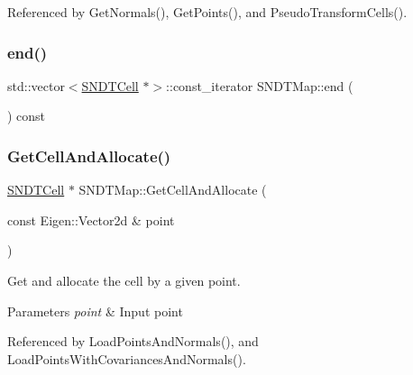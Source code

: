 Referenced by Get\+Normals(), Get\+Points(), and Pseudo\+Transform\+Cells().

\mbox{\label{classSNDTMap_a521ae4876c13844c648726fb005b4400}} 
\subsubsection{\texorpdfstring{end()}{end()}\hspace{0.1cm}{\footnotesize\ttfamily [2/2]}}
{\footnotesize\ttfamily std\+::vector$<$\hyperlink{classSNDTCell}{S\+N\+D\+T\+Cell} $\ast$$>$\+::const\+\_\+iterator S\+N\+D\+T\+Map\+::end (\begin{DoxyParamCaption}{ }\end{DoxyParamCaption}) const\hspace{0.3cm}{\ttfamily [inline]}}

\mbox{\label{classSNDTMap_ad684a85e74b42f6aecdb42961789877e}} 
\subsubsection{\texorpdfstring{Get\+Cell\+And\+Allocate()}{GetCellAndAllocate()}}
{\footnotesize\ttfamily \hyperlink{classSNDTCell}{S\+N\+D\+T\+Cell} $\ast$ S\+N\+D\+T\+Map\+::\+Get\+Cell\+And\+Allocate (\begin{DoxyParamCaption}\item[{const Eigen\+::\+Vector2d \&}]{point }\end{DoxyParamCaption})}



Get and allocate the cell by a given point. 


\begin{DoxyParams}{Parameters}
{\em point} & Input point \\
\hline
\end{DoxyParams}


Referenced by Load\+Points\+And\+Normals(), and Load\+Points\+With\+Covariances\+And\+Normals().

\mbox{\label{classSNDTMap_a6b7fa06144fcde3cb9e9df560d48bdee}} 
